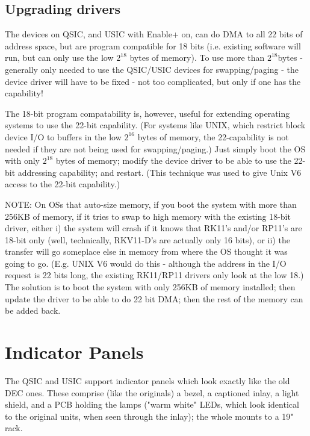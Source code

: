 \section{Upgrading drivers}

The devices on QSIC, and USIC with Enable+ on, can do DMA to all 22 bits of
address space, but are program compatible for 18 bits (i.e. existing software
will run, but can only use the low $2^{18}$ bytes of memory). To use more
than $2^{18}$bytes - generally only needed to use the QSIC/USIC devices for
swapping/paging - the device driver will have to be fixed - not too
complicated, but only if one has the capability!

The 18-bit program compatability is, however, useful for extending operating
systems to use the 22-bit capability. (For systems like UNIX, which restrict
block device I/O to buffers in the low $2^{16}$ bytes of memory, the
22-capability is not needed if they are not being used for swapping/paging.)
Just simply boot the OS with only $2^{18}$ bytes of memory; modify the device
driver to be able to use the 22-bit addressing capability; and restart. (This
technique was used to give Unix V6 access to the 22-bit capability.)

NOTE: On OSs that auto-size memory, if you boot the system with more than
256KB of memory, if it tries to swap to high memory with the existing 18-bit
driver, either i) the system will crash if it knows that RK11's and/or RP11's
are 18-bit only (well, technically, RKV11-D's are actually only 16 bits), or
ii) the transfer will go someplace else in memory from where the OS thought
it was going to go. (E.g. UNIX V6 would do this - although the address in the
I/O request is 22 bits long, the existing RK11/RP11 drivers only look at the
low 18.) The solution is to boot the system with only 256KB of memory
installed; then update the driver to be able to do 22 bit DMA; then the rest
of the memory can be added back.

\chapter{Indicator Panels}

The QSIC and USIC support indicator panels which look exactly like the old
DEC ones. These comprise (like the originals) a bezel, a captioned inlay, a
light shield, and a PCB holding the lamps ("warm white" LEDs, which look
identical to the original units, when seen through the inlay); the whole
mounts to a 19" rack.


